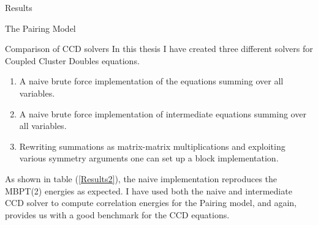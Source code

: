 \documentclass[twoside,english]{uiofysmaster}
\begin{document}
\begin{chapter}{Results}
\begin{section}{The Pairing Model}
		\begin{subsection}{Comparison of CCD solvers}
			In this thesis I have created three different solvers for Coupled Cluster Doubles equations. 
			\begin{enumerate}
				\item A naive brute force implementation of the equations summing over all variables. 
				\item A naive brute force implementation of intermediate equations summing over all variables.
				\item Rewriting summations as matrix-matrix multiplications and exploiting various symmetry arguments one can set up a block implementation.
			\end{enumerate}		
			As shown in table (\ref{Results2}), the naive implementation reproduces the MBPT(2) energies as expected. I have used both the naive and intermediate CCD solver to compute correlation energies for the Pairing model, and again, \cite{Hjorth-Jensen2016} provides us with a good benchmark for the CCD equations.


\end{subsection}
\end{section}
\end{chapter}
\end{document}
